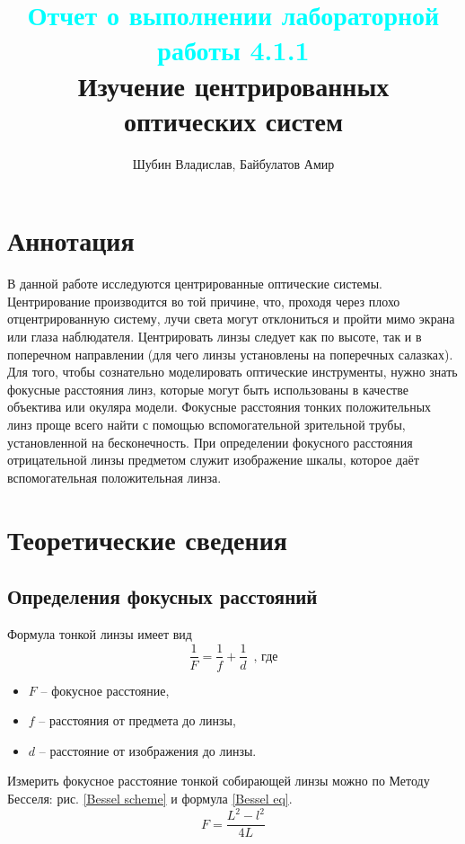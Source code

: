 \documentclass[
a4paper, %
12pt, %
]{article}
\title{
	\textcolor{cyan}{Отчет о выполнении лабораторной работы 4.1.1}
	\\
	Изучение центрированных оптических систем
}
\author{Шубин Владислав, Байбулатов Амир}
\begin{document}
    
	
	\maketitle
	
	\section{Аннотация}
	В данной работе исследуются центрированные оптические системы. Центрирование производится во той причине, что, проходя через плохо отцентрированную систему, лучи света могут отклониться и пройти мимо экрана или глаза наблюдателя. Центрировать линзы следует как по высоте, так и в поперечном направлении (для чего линзы установлены на поперечных салазках). Для того, чтобы сознательно моделировать оптические инструменты, нужно знать фокусные расстояния линз, которые могут быть использованы в качестве объектива или окуляра модели. Фокусные расстояния тонких положительных линз проще всего найти с помощью вспомогательной зрительной трубы, установленной на бесконечность. При определении фокусного расстояния отрицательной линзы предметом служит изображение шкалы, которое даёт вспомогательная положительная линза.
	
	\newpage
	
	\section{Теоретические сведения}
	
	\subsection*{Определения фокусных расстояний}
	Формула тонкой линзы имеет вид
	\begin{equation}
		\frac{1}{F} = \frac{1}{f} + \frac{1}{d}\, \text{ , где}
	\end{equation}
	\begin{itemize}
		\item $F$ -- фокусное расстояние,
		\item $f$ -- расстояния от предмета до линзы,
		\item $d$ -- расстояние от изображения до линзы.
	\end{itemize}
	
	Измерить фокусное расстояние тонкой собирающей линзы можно по Методу Бесселя: рис. \ref{Bessel scheme} и формула \eqref{Bessel eq}.
	\begin{equation}
		F = \frac{L^2 - l^2}{4L}
		\label{Bessel eq}
	\end{equation}
	
\end{document}
